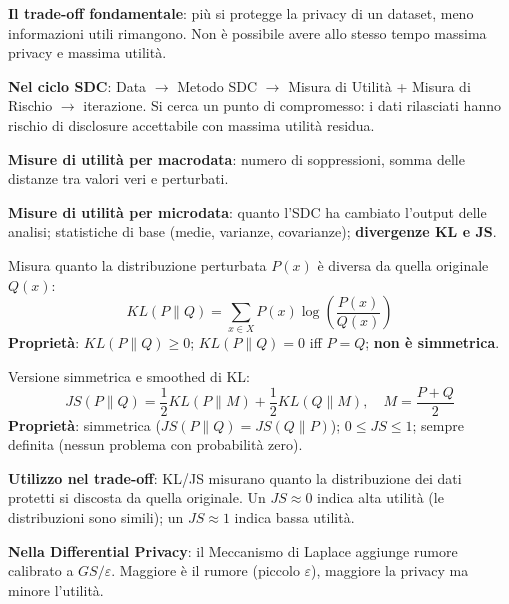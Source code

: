 \documentclass[a4paper,11pt]{article}
\begin{document}
\textbf{Il trade-off fondamentale}: pi\`{u} si protegge la privacy di un dataset, meno informazioni utili rimangono. Non \`{e} possibile avere allo stesso tempo massima privacy e massima utilit\`{a}.

\textbf{Nel ciclo SDC}: Data $\to$ Metodo SDC $\to$ Misura di Utilit\`{a} + Misura di Rischio $\to$ iterazione. Si cerca un punto di compromesso: i dati rilasciati hanno rischio di disclosure accettabile con massima utilit\`{a} residua.

\textbf{Misure di utilit\`{a} per macrodata}: numero di soppressioni, somma delle distanze tra valori veri e perturbati.

\textbf{Misure di utilit\`{a} per microdata}: quanto l'SDC ha cambiato l'output delle analisi; statistiche di base (medie, varianze, covarianze); \textbf{divergenze KL e JS}.

\begin{tcolorbox}[colback=gray!5!white, colframe=gray!60!black, title=\textbf{Kullback-Leibler (KL) Divergence}]
Misura quanto la distribuzione perturbata $P(x)$ \`{e} diversa da quella originale $Q(x)$:
\[
KL(P \| Q) = \sum_{x \in X} P(x) \log\!\left(\frac{P(x)}{Q(x)}\right)
\]
\textbf{Propriet\`{a}}: $KL(P\|Q) \geq 0$; $KL(P\|Q) = 0$ iff $P = Q$; \textbf{non \`{e} simmetrica}.
\end{tcolorbox}

\begin{tcolorbox}[colback=gray!5!white, colframe=gray!60!black, title=\textbf{Jensen-Shannon (JS) Divergence}]
Versione simmetrica e smoothed di KL:
\[
JS(P \| Q) = \frac{1}{2}KL(P \| M) + \frac{1}{2}KL(Q \| M), \quad M = \frac{P + Q}{2}
\]
\textbf{Propriet\`{a}}: simmetrica ($JS(P\|Q) = JS(Q\|P)$); $0 \leq JS \leq 1$; sempre definita (nessun problema con probabilit\`{a} zero).
\end{tcolorbox}

\textbf{Utilizzo nel trade-off}: KL/JS misurano quanto la distribuzione dei dati protetti si discosta da quella originale. Un $JS \approx 0$ indica alta utilit\`{a} (le distribuzioni sono simili); un $JS \approx 1$ indica bassa utilit\`{a}.

\textbf{Nella Differential Privacy}: il Meccanismo di Laplace aggiunge rumore calibrato a $GS/\varepsilon$. Maggiore \`{e} il rumore (piccolo $\varepsilon$), maggiore la privacy ma minore l'utilit\`{a}.
\end{document}

